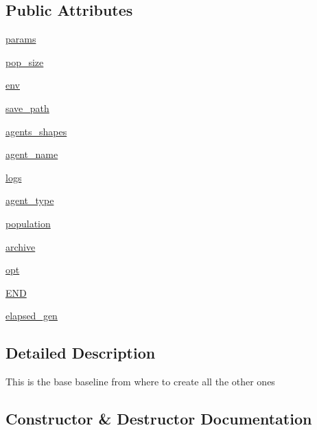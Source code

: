 \subsection*{Public Attributes}
\begin{DoxyCompactItemize}
\item 
\hyperlink{classbaseline_1_1_base_baseline_adcea2415797956c07930e4db7598ad28}{params}
\item 
\hyperlink{classbaseline_1_1_base_baseline_aa7ff398e0c84c732fc65d0934c4870ce}{pop\+\_\+size}
\item 
\hyperlink{classbaseline_1_1_base_baseline_afb0d3522c7976304a758f54ff9c4989a}{env}
\item 
\hyperlink{classbaseline_1_1_base_baseline_a36559a4e95820ade0b95a175f0b39a2b}{save\+\_\+path}
\item 
\hyperlink{classbaseline_1_1_base_baseline_a8fb325474468a95f6a840499a4cdf913}{agents\+\_\+shapes}
\item 
\hyperlink{classbaseline_1_1_base_baseline_a416a8eb8cc77bb0652baa563fdaf4504}{agent\+\_\+name}
\item 
\hyperlink{classbaseline_1_1_base_baseline_a56bf3516ab521483df8f7a7ebb95c819}{logs}
\item 
\hyperlink{classbaseline_1_1_base_baseline_ab9221274313873c2320edbde768834ba}{agent\+\_\+type}
\item 
\hyperlink{classbaseline_1_1_base_baseline_a4ba25bf5a661ce06ced3040dc0a5df9b}{population}
\item 
\hyperlink{classbaseline_1_1_base_baseline_ac24bd116365383ac1d46402dd0ae9bed}{archive}
\item 
\hyperlink{classbaseline_1_1_base_baseline_a174fbe5c014bb79a05006b255c342a9f}{opt}
\item 
\hyperlink{classbaseline_1_1_base_baseline_abcafb27e04595f1add2863291b96655e}{E\+ND}
\item 
\hyperlink{classbaseline_1_1_base_baseline_acf118715fa2638fc8e59c74aefe2852d}{elapsed\+\_\+gen}
\end{DoxyCompactItemize}


\subsection{Detailed Description}
\begin{DoxyVerb}This is the base baseline from where to create all the other ones
\end{DoxyVerb}
 

\subsection{Constructor \& Destructor Documentation}
